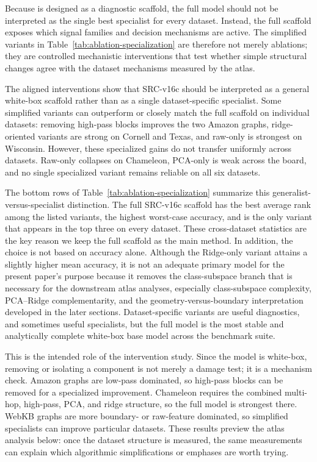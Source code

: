 Because \SRC{} is designed as a diagnostic scaffold, the full model should not
be interpreted as the single best specialist for every dataset. Instead, the
full scaffold exposes which signal families and decision mechanisms are active.
The simplified variants in Table~\ref{tab:ablation-specialization} are
therefore not merely ablations; they are controlled mechanistic interventions
that test whether simple structural changes agree with the dataset mechanisms
measured by the atlas.



The aligned interventions show that SRC-v16c should be interpreted as a
general white-box scaffold rather than as a single dataset-specific specialist.
Some simplified variants can outperform or closely match the full scaffold on
individual datasets: removing high-pass blocks improves the two Amazon graphs,
ridge-oriented variants are strong on Cornell and Texas, and raw-only is
strongest on Wisconsin. However, these specialized gains do not transfer
uniformly across datasets. Raw-only collapses on Chameleon, PCA-only is weak
across the board, and no single specialized variant remains reliable on all
six datasets.

The bottom rows of Table~\ref{tab:ablation-specialization} summarize this
generalist-versus-specialist distinction. The full SRC-v16c scaffold has the
best average rank among the listed variants, the highest worst-case accuracy,
and is the only variant that appears in the top three on every dataset. These
cross-dataset statistics are the key reason we keep the full scaffold as the
main method. In addition, the choice is not based on accuracy alone. Although
the Ridge-only variant attains a slightly higher mean accuracy, it is not an
adequate primary model for the present paper's purpose because it removes the
class-subspace branch that is necessary for the downstream atlas analyses,
especially class-subspace complexity, PCA--Ridge complementarity, and the
geometry-versus-boundary interpretation developed in the later sections.
Dataset-specific variants are useful diagnostics, and sometimes useful
specialists, but the full model is the most stable and analytically complete
white-box base model across the benchmark suite.

This is the intended role of the intervention study. Since the model is
white-box, removing or isolating a component is not merely a damage test; it is
a mechanism check. Amazon graphs are low-pass dominated, so high-pass blocks
can be removed for a specialized improvement. Chameleon requires the combined
multi-hop, high-pass, PCA, and ridge structure, so the full model is strongest
there. WebKB graphs are more boundary- or raw-feature dominated, so simplified
specialists can improve particular datasets. These results preview the atlas
analysis below: once the dataset structure is measured, the same measurements
can explain which algorithmic simplifications or emphases are worth trying.

